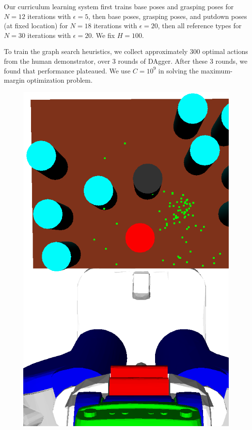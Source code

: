 Our curriculum learning system first trains base poses and grasping poses for $N = 12$ iterations with $\epsilon = 5$,
then base poses, grasping poses, and putdown poses (at fixed location) for $N = 18$ iterations with $\epsilon = 20$,
then all reference types for $N = 30$ iterations with $\epsilon = 20$. We fix $H = 100$.

To train the graph search heuristics,
we collect approximately 300 optimal actions from the human demonstrator, over 3 rounds of {\sc DAgger}. After these 3 rounds,
we found that performance plateaued. We use $C = 10^{9}$ in solving the maximum-margin optimization problem.

\begin{figure}[t]
  \centering
    \noindent
    \includegraphics[scale=0.13]{images/grasp_context_1.png}

\end{figure}
